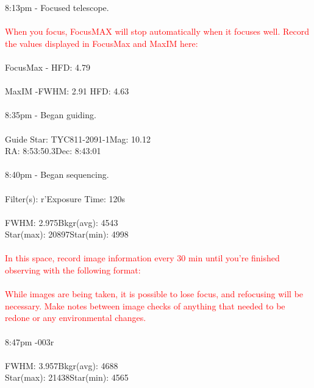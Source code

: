 \documentclass[11pt]{report}
\begin{document}
8:13pm - Focused telescope. \\ \\
\textcolor{red}{When you focus, FocusMAX will stop automatically when it focuses well. Record the values displayed in FocusMax and MaxIM here:} \\  \\
FocusMax - \hspace{72pt}HFD: 4.79 \\ \\
MaxIM -\hspace{90pt}FWHM: 2.91 \hspace{75pt}HFD: 4.63 \\ \\
8:35pm - Began guiding. \\ \\
Guide Star: TYC811-2091-1\hspace{20pt}Mag: 10.12 \\
RA: 8:53:50.3\hspace{90pt}Dec: 8:43:01\\ \\
8:40pm - Began sequencing. \\ \\
Filter(s): r'\hspace{83pt}Exposure Time: 120s\\ \\
FWHM: 2.975\hspace{70pt}Bkgr(avg): 4543 \\
Star(max): 20897\hspace{55pt}Star(min): 4998\\ \\
\textcolor{red}{In this space, record image information every 30 min until you're finished observing with the following format:} \\ \\ 
\textcolor{red}{While images are being taken, it is possible to lose focus, and refocusing will be necessary. Make notes between image checks of anything that needed to be redone or any environmental changes.} \\ \\ 
8:47pm -\hspace{97pt}003r \\ \\
FWHM: 3.957\hspace{70pt}Bkgr(avg): 4688 \\
Star(max): 21438\hspace{55pt}Star(min): 4565\\ \\
\end{document}
